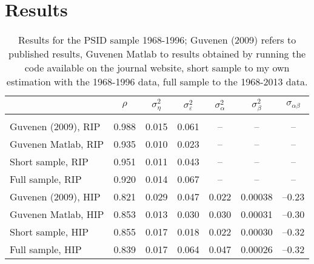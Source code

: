 \section{Results}
\begin{table}%
\begin{tabular}{l|cccccc}
                    &$\rho$ & $\sigma^2_{\eta}$&$\sigma^2_{\varepsilon}$&$\sigma^2_{\alpha}$&$\sigma^2_{\beta}$&$\sigma_{\alpha \beta}$\\
\hline
\hline \\
Guvenen (2009), RIP & 0.988 &  0.015           &   0.061                &       --          &        --        &        --             \\
Guvenen Matlab, RIP & 0.935 &  0.010           &   0.023                &       --          &        --        &        --             \\
Short sample, RIP   & 0.951 &  0.011           &   0.043                &       --          &        --        &        --             \\
Full sample, RIP    & 0.920 &  0.014           &   0.067                &       --          &        --        &        --             \\
\hline
Guvenen (2009), HIP & 0.821 &  0.029           &   0.047                &   0.022           &     0.00038      &     --0.23            \\
Guvenen Matlab, HIP & 0.853 &  0.013           &   0.030                &   0.030           &     0.00031      &     --0.30            \\
Short sample, HIP   & 0.855 &  0.017           &   0.018                &   0.022           &     0.00030      &     --0.32            \\ 
Full sample, HIP    & 0.839 &  0.017           &   0.064                &   0.047           &     0.00026      &     --0.32            \\ 
\hline
\end{tabular}
\caption{Results for the PSID sample 1968-1996; Guvenen (2009) refers to published results, Guvenen Matlab to results obtained by running
the code available on the journal website, short sample to my own estimation with the 1968-1996 data, full sample to the 1968-2013 data.}
\label{hip_rip_results}
\end{table}


